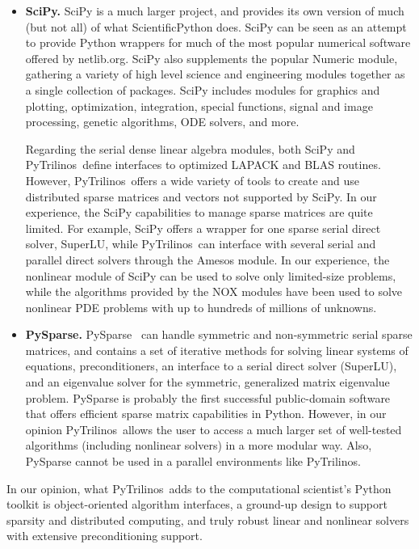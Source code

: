 \documentclass[acmtocl]{acmtrans2m}
\newcommand{\PyTrilinos}{{PyTrilinos}}
\begin{document}
\begin{itemize}
\item {\bf SciPy.} SciPy is a much larger project, and provides its
  own version of much (but not all) of what ScientificPython does.
  SciPy can be seen as an attempt to provide Python wrappers for much
  of the most popular numerical software offered by netlib.org.  SciPy
  also supplements the popular Numeric module, gathering a variety of
  high level science and engineering modules together as a single
  collection of packages.  SciPy includes modules for graphics and
  plotting, optimization, integration, special functions, signal and
  image processing, genetic algorithms, ODE solvers, and more.

  Regarding the serial dense linear algebra modules, both SciPy and
  \PyTrilinos\ define interfaces to optimized LAPACK and BLAS
  routines. However, \PyTrilinos\ offers a wide variety of tools to
  create and use distributed sparse matrices and vectors not supported
  by SciPy.  In our experience, the SciPy capabilities to manage
  sparse matrices are quite limited.  For example, SciPy offers a
  wrapper for one sparse serial direct solver, SuperLU, while
  \PyTrilinos\ can interface with several serial and parallel direct
  solvers through the Amesos module.  In our experience, the nonlinear
  module of SciPy can be used to solve only limited-size problems,
  while the algorithms provided by the NOX modules have been used to
  solve nonlinear PDE problems with up to hundreds of millions of
  unknowns.

\item {\bf PySparse.}  PySparse~\cite{broker05using} can handle
  symmetric and non-symmetric serial sparse matrices, and contains a
  set of iterative methods for solving linear systems of equations,
  preconditioners, an interface to a serial direct solver (SuperLU),
  and an eigenvalue solver for the symmetric, generalized matrix
  eigenvalue problem.  PySparse is probably the first successful
  public-domain software that offers efficient sparse matrix
  capabilities in Python.  However, in our opinion \PyTrilinos\ allows
  the user to access a much larger set of well-tested algorithms
  (including nonlinear solvers) in a more modular way.  Also, PySparse
  cannot be used in a parallel environments like \PyTrilinos.

\end{itemize}

In our opinion, what \PyTrilinos\ adds to the computational scientist's
Python toolkit is object-oriented algorithm interfaces, a ground-up
design to support sparsity and distributed computing, and truly robust
linear and nonlinear solvers with extensive preconditioning support.
\end{document}
